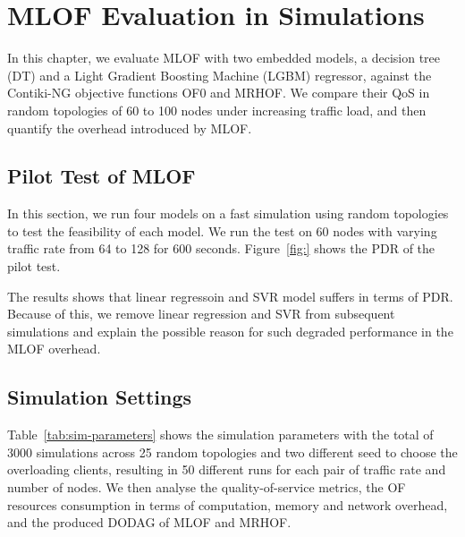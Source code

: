 \chapter{MLOF Evaluation in Simulations}\label{C:Evaluation}
In this chapter, we evaluate MLOF with two embedded models, a decision
tree (DT) and a Light Gradient Boosting Machine (LGBM) regressor,
against the Contiki-NG objective functions OF0 and MRHOF. We compare
their QoS in random topologies of 60 to 100 nodes under increasing
traffic load, and then quantify the overhead introduced by MLOF.

\section{Pilot Test of MLOF}
In this section, we run four models on a fast simulation using random
topologies to test the feasibility of each model. We run the test on
60 nodes with varying traffic rate from 64 to 128 for 600 seconds.
Figure~\ref{fig:} shows the PDR of the pilot test.

The results shows that linear regressoin and SVR model suffers in terms of PDR.
Because of this, we remove linear regression and SVR from subsequent
simulations and explain the possible reason for such degraded
performance in the MLOF overhead.

\section{Simulation Settings}
Table~\ref{tab:sim-parameters} shows the simulation parameters
with the total of 3000 simulations across 25 random topologies and
two different seed to choose the overloading clients, resulting in 50
different runs for each pair of traffic rate and number of nodes. We
then analyse the quality-of-service metrics, the OF resources
consumption in terms
of computation, memory and network overhead, and the produced DODAG
of MLOF and MRHOF.

